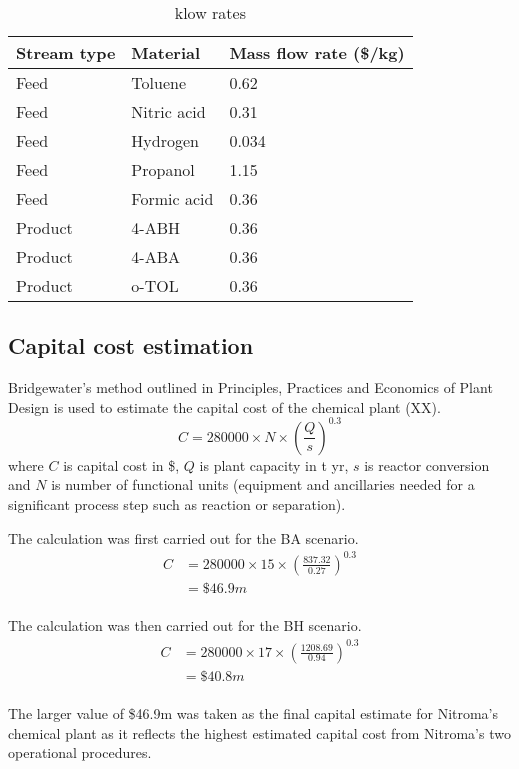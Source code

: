 \begin{table}[h] 
\centering
\caption{klow rates}
\label{tab:material-prices}
\begin{tabular}{lll}
    \toprule
    Stream type    & Material    & Mass flow rate (\$/kg) \\\midrule
    Feed     & Toluene     & 0.62                     \\
    Feed    & Nitric acid & 0.31                      \\
    Feed    & Hydrogen    & 0.034                     \\
    Feed    & Propanol    & 1.15                      \\
    Feed    & Formic acid & 0.36                      \\ 
    Product & 4-ABH       & 0.36                      \\
    Product & 4-ABA       & 0.36                      \\
    Product & o-TOL       & 0.36                      \\\bottomrule
\end{tabular}
\end{table}

\subsection{Capital cost estimation}

Bridgewater's method outlined in Principles, Practices and Economics of Plant Design is used to estimate the capital cost of the chemical plant (XX).\\
\begin{equation}
    C= \num{280000} \times N \times \left(\frac{Q}{s}\right)^{0.3}
\end{equation}
where $C$ is capital cost in \$, $Q$ is  plant capacity in t yr, $s$ is reactor conversion and $N$ is number of functional units (equipment and ancillaries needed for a significant process step such as reaction or separation).

The calculation was first carried out for the BA scenario.
\begin{align*}
C &= \num{280000} \times 15 \times \left(\frac{837.32}{0.27}\right)^{0.3}  \\
  &= \$46.9m 
\end{align*}
 \\
The calculation was then carried out for the BH scenario.
\begin{align*}
C &= 280000 \times 17 \times \left(\frac{1208.69}{0.94}\right)^{0.3}  \\
  &=\$40.8m 
\end{align*}
\\
The larger value of \$46.9m was taken as the final capital estimate for Nitroma's chemical plant as it reflects the highest estimated capital cost from Nitroma's two operational procedures.